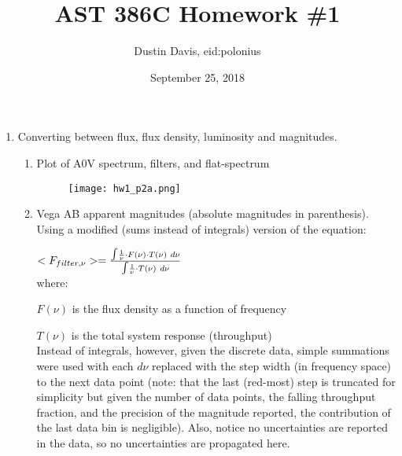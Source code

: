 \documentclass[11pt]{article}
\title{AST 386C Homework \#1}
\author{Dustin Davis, eid:polonius}
\date{September 25, 2018}
\begin{document}
\maketitle







\begin{enumerate}

\item Converting between flux, flux density, luminosity and magnitudes.\\
  \begin{enumerate}
    \item Plot of A0V spectrum, filters, and flat-spectrum
    
    \begin{figure}[H]
         	     \texttt{[image: hw1\_p2a.png]}
         	     \label{fig:fig4}
     \end{figure}
     
 
	 \item Vega AB apparent magnitudes (absolute magnitudes in parenthesis). Using a modified (sums instead of integrals) version of the equation:
	 
	 	\hspace{10mm} $<F_{filter,\nu}> = \frac{\mathlarger{\int} \frac{1}{\nu} \cdot F(\nu) \cdot T(\nu)\ d\nu}{\mathlarger{\int} \frac{1}{\nu} \cdot T(\nu)\ d\nu}$ \\
	 	
	 	where:
	 	
	 	 \hspace {10mm}$F(\nu)$ is the flux density as a function of frequency 
	 	 
	 	 \hspace{10mm} $T(\nu)$ is the total system response (throughput)\\
	 	 
	 	 
	 	 
		Instead of integrals, however, given the discrete data, simple summations were used with each $d\nu$ replaced with the step width (in frequency space) to the next data point (note: that the last (red-most) step is truncated for simplicity but given the number of data points, the falling throughput fraction, and the precision of the magnitude reported, the contribution of the last data bin is negligible). Also, notice no uncertainties are reported in the data, so no uncertainties are propagated here.\\
		

\end{enumerate}
\end{enumerate}
\end{document}
